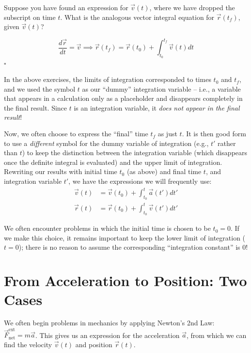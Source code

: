 \documentclass[11pt, letterpaper, openany]{book}
\newenvironment{exercise}[1][Exercise]{%
  \tcolorbox[blanker, breakable, left=1em,
    before skip=1em, after skip=1em,
    borderline west={3pt}{0pt}{PhysNavy},
    colback=PhysCream,
    before upper={\textcolor{PhysNavy}{\sffamily\bfseries #1:}\space}
  ]%
}{%
  \endtcolorbox%
}
\newenvironment{solution}[1][Solution]{%
  \tcolorbox[blanker, breakable, left=1em,
    before skip=1em, after skip=1em,
    borderline west={2pt}{0pt}{PhysTeal},
    colback=PhysCream,
    before upper={\textcolor{PhysTeal}{\sffamily\bfseries #1.}\space}
  ]%
}{%
  \hfill\textcolor{PhysTeal}{\ensuremath{\square}}\endtcolorbox%
}
\begin{document}
\begin{exercise}[Exercise 12]
Suppose you have found an expression for $\vec{v}(t)$, where we have dropped the subscript on time $t$. What is the analogous vector integral equation for $\vec{r}(t_f)$, given $\vec{v}(t)$?
\end{exercise}
\begin{solution}
\[ \frac{d\vec{r}}{dt} = \vec{v} \implies \vec{r}(t_f) = \vec{r}(t_0) + \int_{t_0}^{t_f} \vec{v}(t) dt \]
\end{solution}

In the above exercises, the limits of integration corresponded to times $t_0$ and $t_f$, and we used the symbol $t$ as our ``dummy'' integration variable -- i.e., a variable that appears in a calculation only as a placeholder and disappears completely in the final result. Since $t$ is an integration variable, it \textit{does not appear in the final result}!

Now, we often choose to express the ``final'' time $t_f$ as just $t$. It is then good form to use a \textit{different} symbol for the dummy variable of integration (e.g., $t'$ rather than $t$) to keep the distinction between the integration variable (which disappears once the definite integral is evaluated) and the upper limit of integration. Rewriting our results with initial time $t_0$ (as above) and final time $t$, and integration variable $t'$, we have the expressions we will frequently use:
\begin{align*}
    \vec{v}(t) &= \vec{v}(t_0) + \int_{t_0}^t \vec{a}(t') dt' \\
    \vec{r}(t) &= \vec{r}(t_0) + \int_{t_0}^t \vec{v}(t') dt'
\end{align*}

We often encounter problems in which the initial time is chosen to be $t_0 = 0$. If we make this choice, it remains important to keep the lower limit of integration ($t=0$); there is no reason to assume the corresponding ``integration constant'' is 0!

\chapter{From Acceleration to Position: Two Cases}

We often begin problems in mechanics by applying Newton's 2nd Law: $\vec{F}_{\text{net}}^{\text{ext}} = m\vec{a}$. This gives us an expression for the acceleration $\vec{a}$, from which we can find the velocity $\vec{v}(t)$ and position $\vec{r}(t)$.
\end{document}
